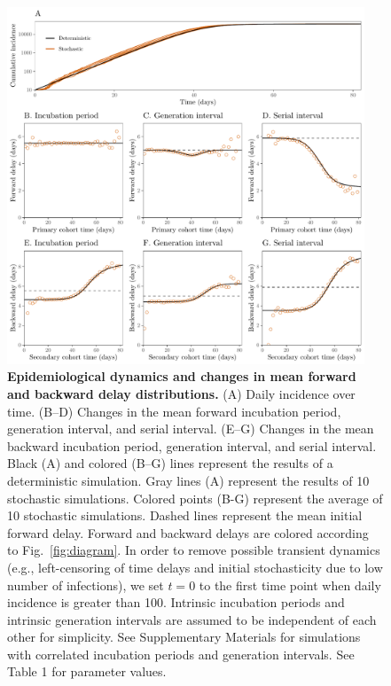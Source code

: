 \documentclass[12pt]{article}
\newcommand{\fref}[1]{Fig.~\ref{fig:#1}}
\begin{document}
\begin{figure}[!ht]
\begin{center}
\includegraphics[width=0.95\textwidth]{forward.pdf}
\caption{
\textbf{Epidemiological dynamics and changes in mean forward and backward delay distributions.}
(A) Daily incidence over time.
(B--D) Changes in the mean forward incubation period, generation interval, and serial interval.
(E--G) Changes in the mean backward incubation period, generation interval, and serial interval.
Black (A) and colored (B--G) lines represent the results of a deterministic simulation.
Gray lines (A) represent the results of 10 stochastic simulations.
Colored points (B-G) represent the average of 10 stochastic simulations.
Dashed lines represent the mean initial forward delay.
Forward and backward delays are colored according to \fref{diagram}.
In order to remove possible transient dynamics (e.g., left-censoring of time delays and initial stochasticity due to low number of infections), we set $t=0$ to the first time point when daily incidence is greater than 100.
Intrinsic incubation periods and intrinsic generation intervals are assumed to be independent of each other for simplicity. See Supplementary Materials for simulations with correlated incubation periods and generation intervals.
See Table 1 for parameter values.
}
\label{fig:epi}
\end{center}
\end{figure}
\end{document}
